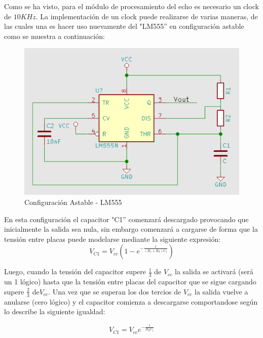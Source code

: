 Como se ha visto, para el módulo de procesamiento del echo es necesario
un clock de $10KHz$. La implementación de un clock puede realizarse
de varias maneras, de las cuales una es hacer uso nuevamente del "LM555''
en configuración astable como se muestra a continuación:

\begin{figure}[H]
\begin{centering}
\includegraphics[scale=0.4]{astable555.PNG}
\par\end{centering}
\caption{Configuración Astable - LM555}
\end{figure}

En esta configuración el capacitor "C1'' comenzará descargado provocando
que inicialmente la salida sea nula, sin embargo comenzará a cargarse
de forma que la tensión entre placas puede modelarse mediante la siguiente
expresión: 
\begin{equation}
    V_{C1}=V_{cc}(1-e^{-\frac{t}{(R_{1}+R_{2})C_{1}}})   
\end{equation}


Luego, cuando la tensión del capacitor supere $\frac{1}{3}$ de $V_{cc}$
la salida se activará (será un 1 lógico) hasta que la tensión entre
placas del capacitor que se sigue cargando supere $\frac{2}{3}$ de$V_{cc}$.
Una vez que se superan los dos tercios de $V_{cc}$ la salida vuelve
a anularse (cero lógico) y el capacitor comienza a descargarse comportandose
según lo describe la siguiente igualdad:

\begin{equation}
V_{C1}=V_{cc}e^{-\frac{t}{R_{2}C_{1}}}
\end{equation}

